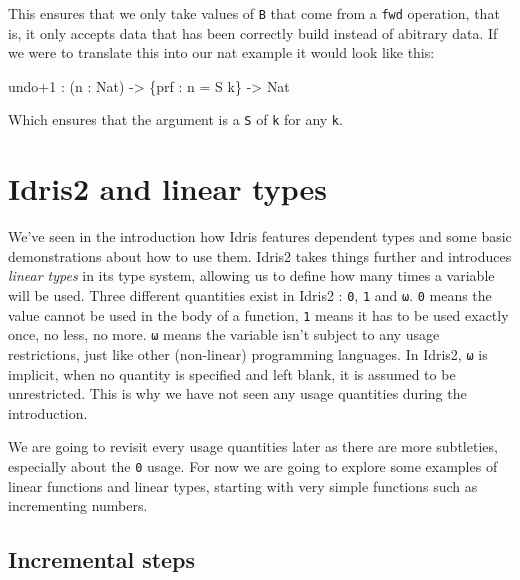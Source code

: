 \documentclass[
]{article}
\newenvironment{Shaded}{}{}
\newcommand{\DataTypeTok}[1]{\textcolor[rgb]{0.56,0.13,0.00}{#1}}
\newcommand{\DecValTok}[1]{\textcolor[rgb]{0.25,0.63,0.44}{#1}}
\newcommand{\NormalTok}[1]{#1}
\newcommand{\OperatorTok}[1]{\textcolor[rgb]{0.40,0.40,0.40}{#1}}
\newcommand{\OtherTok}[1]{\textcolor[rgb]{0.00,0.44,0.13}{#1}}
\begin{document}
This ensures that we only take values of \texttt{B} that come from a
\texttt{fwd} operation, that is, it only accepts data that has been
correctly build instead of abitrary data. If we were to translate this
into our nat example it would look like this:

\begin{Shaded}
\begin{Highlighting}[]
\NormalTok{undo}\OperatorTok{+}\DecValTok{1} \OperatorTok{:}\NormalTok{ (n }\OperatorTok{:} \DataTypeTok{Nat}\NormalTok{) }\OtherTok{{-}\textgreater{}}\NormalTok{ \{prf }\OperatorTok{:}\NormalTok{ n }\OtherTok{=} \DataTypeTok{S}\NormalTok{ k\} }\OtherTok{{-}\textgreater{}} \DataTypeTok{Nat}
\end{Highlighting}
\end{Shaded}

Which ensures that the argument is a \texttt{S} of \texttt{k} for any
\texttt{k}.

\hypertarget{idris2-and-linear-types}{%
\section{Idris2 and linear types}\label{idris2-and-linear-types}}

We've seen in the introduction how Idris features dependent types and
some basic demonstrations about how to use them. Idris2 takes things
further and introduces \emph{linear types} in its type system, allowing
us to define how many times a variable will be used. Three different
quantities exist in Idris2 : \texttt{0}, \texttt{1} and \texttt{ω}.
\texttt{0} means the value cannot be used in the body of a function,
\texttt{1} means it has to be used exactly once, no less, no more.
\texttt{ω} means the variable isn't subject to any usage restrictions,
just like other (non-linear) programming languages. In Idris2,
\texttt{ω} is implicit, when no quantity is specified and left blank, it
is assumed to be unrestricted. This is why we have not seen any usage
quantities during the introduction.

We are going to revisit every usage quantities later as there are more
subtleties, especially about the \texttt{0} usage. For now we are going
to explore some examples of linear functions and linear types, starting
with very simple functions such as incrementing numbers.

\hypertarget{incremental-steps}{%
\subsection{Incremental steps}\label{incremental-steps}}
\end{document}
